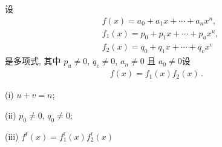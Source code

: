 \begin{proposition}
    设
    \begin{align*}
         & f(x) = a_0 + a_1 x + \cdots + a_n x^n,    \\
         & f_1 (x) = p_0 + p_1 x + \cdots + p_u x^u, \\
         & f_2 (x) = q_0 + q_1 x + \cdots + q_v x^v
    \end{align*}
    是多项式, 其中 $p_u \neq 0$, $q_v \neq 0$, $a_n \neq 0$ 且 $a_0 \neq 0$\period 设
    \begin{align*}
        f(x) = f_1 (x) f_2 (x) \period
    \end{align*}

    (i) $u + v = n$;

    (ii) $p_0 \neq 0$, $q_0 \neq 0$;

    (iii) $f^{\mathrm{r}} (x) = f_1^{\mathrm{r}} (x) f_2^{\mathrm{r}} (x)$\period
\end{proposition}

